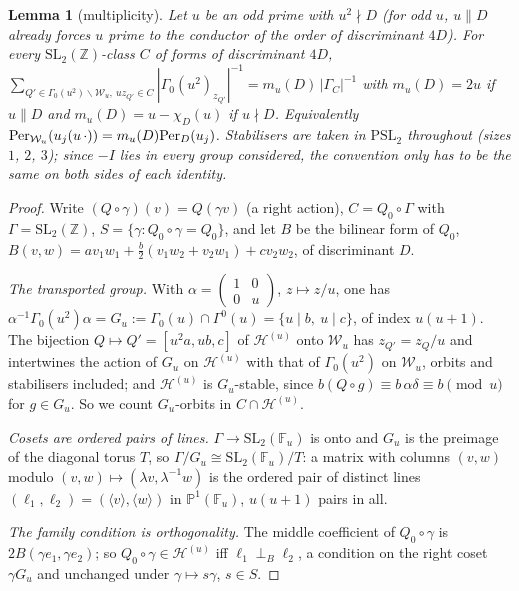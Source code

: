 \documentclass[11pt,a4paper]{article}
\newtheorem{lemma}[theorem]{Lemma}
\theoremstyle{remark}\newtheorem{remark}[theorem]{Remark}
\newcommand{\Z}{\mathbb Z}\newcommand{\R}{\mathbb R}\newcommand{\Q}{\mathbb Q}\newcommand{\HH}{\mathbb H}
\begin{document}
\begin{lemma}[multiplicity]\label{lem:mult}
Let $u$ be an odd prime with $u^2\nmid D$ (for odd $u$, $u\parallel D$ already forces $u$ prime to the conductor of the order of
discriminant $4D$). For every
$\mathrm{SL}_2(\Z)$-class $C$ of forms of discriminant $4D$,
$\sum_{Q'\in\Gamma_0(u^2)\backslash\mathcal W_u,\ uz_{Q'}\in C}|\Gamma_0(u^2)_{z_{Q'}}|^{-1}=m_u(D)\,|\Gamma_C|^{-1}$ with
$m_u(D)=2u$ if $u\parallel D$ and $m_u(D)=u-\chi_D(u)$ if $u\nmid D$. Equivalently $\mathrm{Per}_{\mathcal W_u}(u_j(u\,\cdot))=m_u(D)\mathrm{Per}_D(u_j)$.
Stabilisers are taken in $\mathrm{PSL}_2$ throughout (sizes $1$, $2$, $3$); since $-I$ lies in every group considered, the
convention only has to be the same on both sides of each identity.
\end{lemma}
\begin{proof}
Write $(Q\circ\gamma)(v)=Q(\gamma v)$ (a right action), $C=Q_0\circ\Gamma$ with $\Gamma=\mathrm{SL}_2(\Z)$, $S=\{\gamma:Q_0\circ\gamma=Q_0\}$,
and let $B$ be the bilinear form of $Q_0$, $B(v,w)=av_1w_1+\tfrac b2(v_1w_2+v_2w_1)+cv_2w_2$, of discriminant $D$.

\emph{The transported group.} With $\alpha=\left(\begin{smallmatrix}1&0\\0&u\end{smallmatrix}\right)$, $z\mapsto z/u$, one has
$\alpha^{-1}\Gamma_0(u^2)\alpha=G_u:=\Gamma_0(u)\cap\Gamma^0(u)=\{u\mid b,\ u\mid c\}$, of index $u(u+1)$. The bijection
$Q\mapsto Q'=[u^2a,ub,c]$ of $\mathcal H^{(u)}$ onto $\mathcal W_u$ has $z_{Q'}=z_Q/u$ and intertwines the action of $G_u$ on
$\mathcal H^{(u)}$ with that of $\Gamma_0(u^2)$ on $\mathcal W_u$, orbits and stabilisers included; and $\mathcal H^{(u)}$ is
$G_u$-stable, since $b(Q\circ g)\equiv b\,\alpha\delta\equiv b\pmod u$ for $g\in G_u$. So we count $G_u$-orbits in
$C\cap\mathcal H^{(u)}$.

\emph{Cosets are ordered pairs of lines.} $\Gamma\to\mathrm{SL}_2(\mathbb F_u)$ is onto and $G_u$ is the preimage of the diagonal
torus $T$, so $\Gamma/G_u\cong\mathrm{SL}_2(\mathbb F_u)/T$: a matrix with columns $(v,w)$ modulo $(v,w)\mapsto(\lambda v,\lambda^{-1}w)$
is the ordered pair of distinct lines $(\ell_1,\ell_2)=(\langle v\rangle,\langle w\rangle)$ in $\mathbb P^1(\mathbb F_u)$,
$u(u+1)$ pairs in all.

\emph{The family condition is orthogonality.} The middle coefficient of $Q_0\circ\gamma$ is $2B(\gamma e_1,\gamma e_2)$; so
$Q_0\circ\gamma\in\mathcal H^{(u)}$ iff $\ell_1\perp_B\ell_2$, a condition on the right coset $\gamma G_u$ and unchanged under
$\gamma\mapsto s\gamma$, $s\in S$.


\end{proof}
\end{document}
